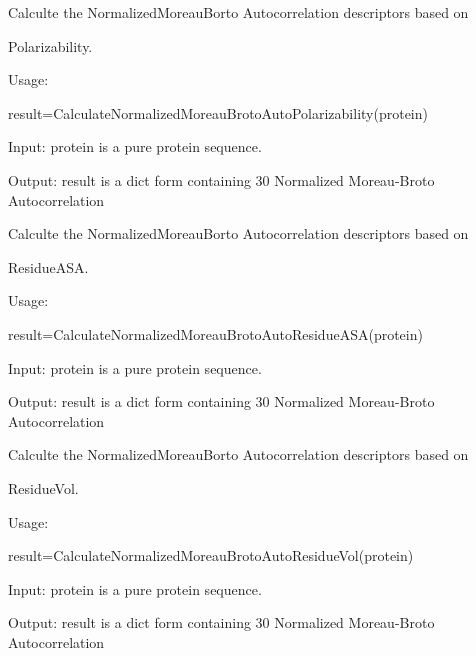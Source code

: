 \documentclass[letterpaper,10pt,english]{sphinxmanual}
\begin{document}

\begin{fulllineitems}
\label{reference/Autocorrelation:Autocorrelation.CalculateNormalizedMoreauBrotoAutoPolarizability}
Calculte the NormalizedMoreauBorto Autocorrelation descriptors based on

Polarizability.

Usage:

result=CalculateNormalizedMoreauBrotoAutoPolarizability(protein)

Input: protein is a pure protein sequence.

Output: result is a dict form containing 30 Normalized Moreau-Broto Autocorrelation

\end{fulllineitems}


\begin{fulllineitems}
\label{reference/Autocorrelation:Autocorrelation.CalculateNormalizedMoreauBrotoAutoResidueASA}
Calculte the NormalizedMoreauBorto Autocorrelation descriptors based on

ResidueASA.

Usage:

result=CalculateNormalizedMoreauBrotoAutoResidueASA(protein)

Input: protein is a pure protein sequence.

Output: result is a dict form containing 30 Normalized Moreau-Broto Autocorrelation

\end{fulllineitems}


\begin{fulllineitems}
\label{reference/Autocorrelation:Autocorrelation.CalculateNormalizedMoreauBrotoAutoResidueVol}
Calculte the NormalizedMoreauBorto Autocorrelation descriptors based on

ResidueVol.

Usage:

result=CalculateNormalizedMoreauBrotoAutoResidueVol(protein)

Input: protein is a pure protein sequence.

Output: result is a dict form containing 30 Normalized Moreau-Broto Autocorrelation

\end{fulllineitems}
\end{document}
